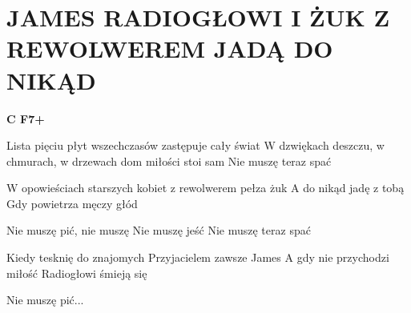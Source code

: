 \documentclass[../../../songbook.tex]{subfiles}
\begin{document}
\TabPositions{11cm} %
\section*{JAMES RADIOGŁOWI I ŻUK Z REWOLWEREM JADĄ DO NIKĄD}
{}
\vspace{0.5cm}
{\color{red}\textbf{C F7+} } \newline

Lista pięciu płyt wszechczasów zastępuje cały świat  \newline
W dzwiękach deszczu, w chmurach, w drzewach dom miłości stoi sam \newline
Nie muszę teraz spać \newline

W opowieściach starszych kobiet z rewolwerem pełza żuk \newline
A do nikąd jadę z tobą \newline
Gdy powietrza męczy głód \newline

\-\hspace{1cm} Nie muszę pić, nie muszę  \newline
\-\hspace{1cm} Nie muszę jeść	 \newline
\-\hspace{1cm} Nie muszę teraz spać \newline

Kiedy tesknię do znajomych \newline
Przyjacielem zawsze James \newline
A gdy nie przychodzi miłość \newline
Radiogłowi śmieją się \newline

\-\hspace{1cm} Nie muszę pić... \newline
\end{document}
